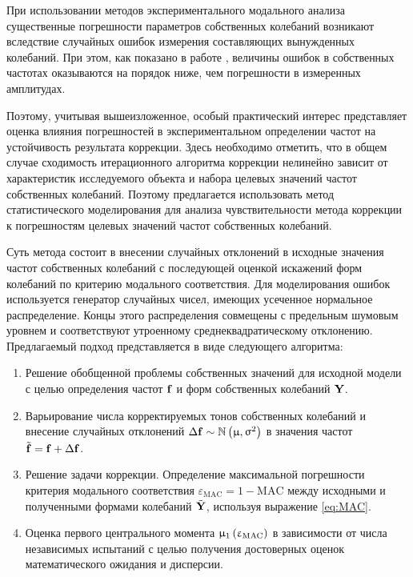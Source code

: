 При использовании методов экспериментального модального анализа существенные погрешности параметров собственных колебаний возникают вследствие случайных ошибок измерения составляющих вынужденных колебаний. При этом, как показано в работе \cite{lib:ema:Berns}, величины ошибок в собственных частотах оказываются на порядок ниже, чем погрешности в измеренных амплитудах. 

Поэтому, учитывая вышеизложенное, особый практический интерес представляет оценка влияния погрешностей в экспериментальном определении частот на устойчивость результата коррекции. Здесь необходимо отметить, что в общем случае сходимость итерационного алгоритма коррекции нелинейно зависит от характеристик исследуемого объекта и набора целевых значений частот собственных колебаний. Поэтому предлагается использовать метод статистического моделирования для анализа чувствительности метода коррекции к погрешностям целевых значений частот собственных колебаний.

Суть метода состоит в внесении случайных отклонений в исходные значения частот собственных колебаний с последующей оценкой искажений форм колебаний по критерию модального соответствия. Для моделирования ошибок используется генератор случайных чисел, имеющих усеченное нормальное распределение. Концы этого распределения совмещены с предельным шумовым уровнем и соответствуют утроенному среднеквадратическому отклонению. Предлагаемый подход представляется в виде следующего алгоритма:
\begin{enumerate}[noitemsep]
	\item Решение обобщенной проблемы собственных значений для исходной модели с целью определения частот $ \mathbf{f} $ и форм собственных колебаний $ \mathbf{Y} $.
	\item Варьирование числа корректируемых тонов собственных колебаний и внесение случайных отклонений $ \Delta \mathbf{f} \sim \mathbb{N} \left( \upmu, \upsigma^2 \right) $ в значения частот $ \tilde{\mathbf{f}} = \mathbf{f} + \Delta \mathbf{f} $. \label{item:startCyclePerturbation}
	\item Решение задачи коррекции. Определение максимальной погрешности критерия модального соответствия $\varepsilon_{\mathrm{MAC}} = 1 - \mathrm{MAC}$ между исходными и полученными формами колебаний $ \tilde{\mathbf{Y}}$, используя выражение \eqref{eq:MAC}.
	\item Оценка первого центрального момента $ \upmu_1\left( \upvarepsilon_{\mathrm{MAC}} \right) $ в зависимости от числа независимых испытаний с целью получения достоверных оценок математического ожидания и дисперсии. \label{item:endCyclePerturbation}
\end{enumerate}

